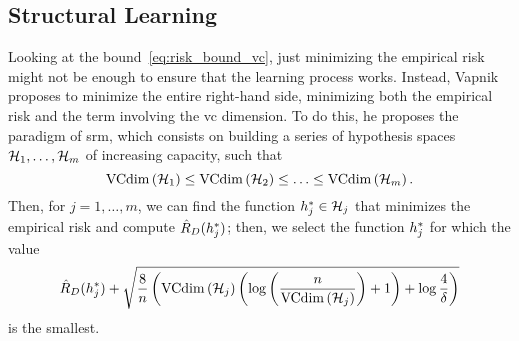 \subsection{Structural Learning}
Looking at the bound~\eqref{eq:risk_bound_vc}, just minimizing the empirical risk might not be enough to ensure that the learning process works. Instead, Vapnik proposes to minimize the entire right-hand side, minimizing both the empirical risk and the term involving the \acrshort{vc} dimension.
To do this, he proposes the paradigm of \acrfull{srm}, which consists on building a series of hypothesis spaces $\mathcal{H}_1, \ldots, \mathcal{H}_m$ of increasing capacity, such that 
\begin{equation}
    \nonumber
    \operatorname{VCdim}\left(\mathcal{H}_1\right) \leq \operatorname{VCdim}\left(\mathcal{H}_2\right) \leq \ldots \leq \operatorname{VCdim}\left(\mathcal{H}_m\right) .
\end{equation}
Then, for $j=1, \ldots, m$, we can find the function ${h}^*_j \in \mathcal{H}_j$ that minimizes the empirical risk and compute $\hat{R}_{D}({h}^*_j)$; then, we select the function $ {h}^*_j$ for which the value
\begin{equation}
    \hat{R}_{D}({h}^*_j) + \sqrt{\frac{8}{n} \left(\operatorname{VCdim}\left(\mathcal{H}_j\right) \left(\log\left(\frac{n}{\operatorname{VCdim}\left(\mathcal{H}_j\right)}\right) + 1 \right) + \log \frac{4}{\delta} \right)}
\end{equation}
is the smallest.

